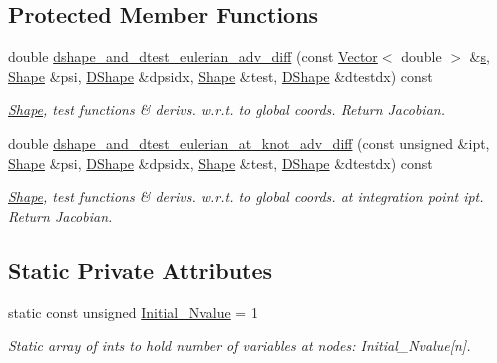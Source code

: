 \subsection*{Protected Member Functions}
\begin{DoxyCompactItemize}
\item 
double \hyperlink{classoomph_1_1QAdvectionDiffusionElement_a968920ec8057c9b5a49154c5845c7dbd}{dshape\+\_\+and\+\_\+dtest\+\_\+eulerian\+\_\+adv\+\_\+diff} (const \hyperlink{classoomph_1_1Vector}{Vector}$<$ double $>$ \&\hyperlink{cfortran_8h_ab7123126e4885ef647dd9c6e3807a21c}{s}, \hyperlink{classoomph_1_1Shape}{Shape} \&psi, \hyperlink{classoomph_1_1DShape}{D\+Shape} \&dpsidx, \hyperlink{classoomph_1_1Shape}{Shape} \&test, \hyperlink{classoomph_1_1DShape}{D\+Shape} \&dtestdx) const
\begin{DoxyCompactList}\small\item\em \hyperlink{classoomph_1_1Shape}{Shape}, test functions \& derivs. w.\+r.\+t. to global coords. Return Jacobian. \end{DoxyCompactList}\item 
double \hyperlink{classoomph_1_1QAdvectionDiffusionElement_afc66bf00b79622cc6580787b9d86f215}{dshape\+\_\+and\+\_\+dtest\+\_\+eulerian\+\_\+at\+\_\+knot\+\_\+adv\+\_\+diff} (const unsigned \&ipt, \hyperlink{classoomph_1_1Shape}{Shape} \&psi, \hyperlink{classoomph_1_1DShape}{D\+Shape} \&dpsidx, \hyperlink{classoomph_1_1Shape}{Shape} \&test, \hyperlink{classoomph_1_1DShape}{D\+Shape} \&dtestdx) const
\begin{DoxyCompactList}\small\item\em \hyperlink{classoomph_1_1Shape}{Shape}, test functions \& derivs. w.\+r.\+t. to global coords. at integration point ipt. Return Jacobian. \end{DoxyCompactList}\end{DoxyCompactItemize}
\subsection*{Static Private Attributes}
\begin{DoxyCompactItemize}
\item 
static const unsigned \hyperlink{classoomph_1_1QAdvectionDiffusionElement_a8befb76f93a0969e14d9a70a16668e8c}{Initial\+\_\+\+Nvalue} = 1
\begin{DoxyCompactList}\small\item\em Static array of ints to hold number of variables at nodes\+: Initial\+\_\+\+Nvalue\mbox{[}n\mbox{]}. \end{DoxyCompactList}\end{DoxyCompactItemize}
